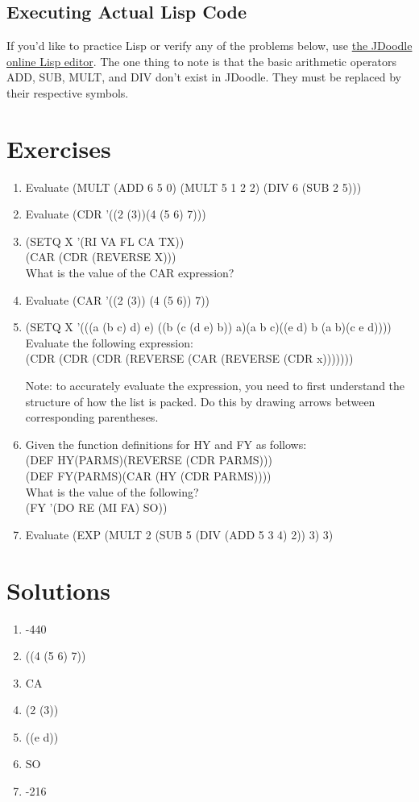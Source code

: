\documentclass[11pt,letterpaper]{article}
\begin{document}
    \subsection{Executing Actual Lisp Code}
    If you'd like to practice Lisp or verify any of the problems below, use
    \href{https://www.jdoodle.com/execute-clisp-online}{the JDoodle online Lisp editor}.
    The one thing to note is that the basic arithmetic operators ADD, SUB, MULT, and DIV
    don't exist in JDoodle.
    They must be replaced by their respective symbols.

    \newpage
    \section{Exercises}
    \begin{enumerate}
        \item Evaluate (MULT (ADD 6 5 0) (MULT 5 1 2 2) (DIV 6 (SUB 2 5)))
        \item Evaluate (CDR '((2 (3))(4 (5 6) 7)))
        \item (SETQ X '(RI VA FL CA TX))\\
        (CAR (CDR (REVERSE X)))\\
        What is the value of the CAR expression?
        \item Evaluate (CAR '((2 (3)) (4 (5 6)) 7))
        \item (SETQ X '(((a (b c) d) e) ((b (c (d e) b)) a)(a b c)((e d) b (a b)(c e d))))\\
        Evaluate the following expression:\\
        (CDR (CDR (CDR (REVERSE (CAR (REVERSE (CDR x)))))))

        Note: to accurately evaluate the expression,
        you need to first understand the structure
        of how the list is packed.
        Do this by drawing arrows between corresponding parentheses.

        \item Given the function definitions for HY and FY as follows:\\
        (DEF HY(PARMS)(REVERSE (CDR PARMS)))\\
        (DEF FY(PARMS)(CAR (HY (CDR PARMS))))\\
        What is the value of the following?\\
        (FY '(DO RE (MI FA) SO))
        \item Evaluate
        (EXP (MULT 2 (SUB 5 (DIV (ADD 5 3 4) 2)) 3) 3)
    \end{enumerate}

    \newpage
    \section{Solutions}
    \begin{enumerate}
        \item -440
        \item ((4 (5 6) 7))
        \item CA
        \item (2 (3))
        \item ((e d))
        \item SO
        \item -216
    \end{enumerate}
\end{document}
